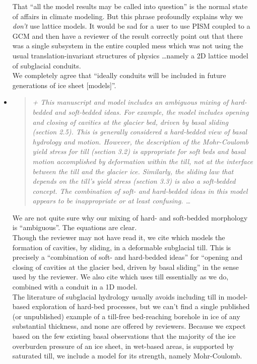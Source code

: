 \documentclass[11pt,reqno]{amsart}
\newcommand{\reply}[2]{
\medskip\medskip
\item  \begin{quote}
\emph{#1}
\end{quote}

\medskip
\noindent #2}
\begin{document}
\begin{itemize}
{\indent That ``all the model results may be called into question'' is the normal state of affairs in climate modeling.  But this phrase profoundly explains why we \emph{don't} use lattice models.  It would be sad for a user to use PISM coupled to a GCM and then have a reviewer of the result correctly point out that there was a single subsystem in the entire coupled mess which was not using the usual translation-invariant structures of physics \dots namely a 2D lattice model of subglacial conduits.\\
\indent We completely agree that ``ideally conduits will be included in future
generations of ice sheet [models]''.}

\reply{+ This manuscript and model includes an ambiguous mixing of hard-bedded and soft-bedded ideas. For example, the model includes opening and closing of cavities at
the glacier bed, driven by basal sliding (section 2.5).  This is generally considered
a hard-bedded view of basal hydrology and motion.  However, the description of the
Mohr-Coulomb yield stress for till (section 3.2) is appropriate for soft beds and basal
motion accomplished by deformation \emph{within} the till, not at the interface between the
till and the glacier ice. Similarly, the sliding law that depends on the till's yield stress
(section 3.3) is also a soft-bedded concept. The combination of soft- and hard-bedded
ideas in this model appears to be inappropriate or at least confusing. \dots}
{We are not quite sure why our mixing of hard- and soft-bedded morphology is ``ambiguous''.  The equations are clear.\\
\indent Though the reviewer may not have read it, we cite \cite{Schoof2007deformable} which models the formation of cavities, by sliding, in a deformable subglacial till.  This is precisely a ``combination of soft- and hard-bedded ideas'' for ``opening and closing of cavities at the glacier bed, driven by basal sliding'' in the sense used by the reviewer.  We also cite   \cite{vanderWeletal2013} which uses till essentially as we do, combined with a conduit in a 1D model. \\
\indent The literature of subglacial hydrology usually avoids including till in model-based exploration of hard-bed processes, but we can't find a single published (or unpublished) example of a till-free bed-reaching borehole in ice of any substantial thickness, and none are offered by reviewers.  Because we expect based on the few existing basal observations that the majority of the ice overburden pressure of an ice sheet, in wet-based areas, is supported by saturated till, we include a model for its strength, namely Mohr-Coulomb. \\
}
\end{itemize}
\end{document}

